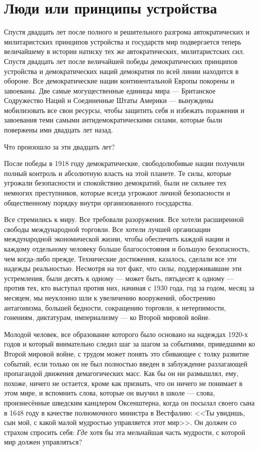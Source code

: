 \chapter{Люди или принципы устройства}

\sloppy Спустя двадцать лет после полного и решительного разгрома автократических и милитаристских принципов устройства и государств мир подвергается теперь величайшему в истории натиску тех же автократических, милитаристских сил. Спустя двадцать лет после величайшей победы демократических принципов устройства и демократических наций демократия по всей линии находится в обороне. Все демократические нации континентальной Европы покорены и завоеваны. Две самые могущественные единицы мира — Британское Содружество Наций и Соединенные Штаты Америки — вынуждены мобилизовать все свои ресурсы, чтобы защитить себя и избежать поражения и завоевания теми самыми антидемократическими силами, которые были повержены ими двадцать лет назад.

Что произошло за эти двадцать лет?

После победы в 1918 году демократические, свободолюбивые нации получили полный контроль и абсолютную власть на этой планете. Те силы, которые угрожали безопасности и спокойствию демократий, были не сильнее тех немногих преступников, которые всегда угрожают личной безопасности и общественному порядку внутри организованного государства.

Все стремились к миру. Все требовали разоружения. Все хотели расширенной свободы международной торговли. Все хотели лучшей организации международной экономической жизни, чтобы обеспечить каждой нации и каждому отдельному человеку больше благосостояния и большую безопасность, чем когда-либо прежде. Технические достижения, казалось, сделали все эти надежды реальностью. Несмотря на тот факт, что силы, поддерживавшие эти устремления, были десять к одному — может быть, пятьдесят к одному — против тех, кто выступал против них, начиная с 1930 года, год за годом, месяц за месяцем, мы неуклонно шли к увеличению вооружений, обострению антагонизма, большей бедности, сокращению торговли, к нетерпимости, гонениям, диктатурам, империализму — ко Второй мировой войне.

Молодой человек, все образование которого было основано на надеждах 1920-х годов и который внимательно следил шаг за шагом за событиями, приведшими ко Второй мировой войне, с трудом может понять это сбивающее с толку развитие событий, если только он не был полностью введен в заблуждение разлагающей пропагандой движения демагогических масс. Как бы он ни размышлял, ему, похоже, ничего не остается, кроме как признать, что он ничего не понимает в этом мире, и вспомнить слова, которые он выучил в школе — слова, произнесённые шведским канцлером Оксенштерна, когда он посылал своего сына в 1648 году в качестве полномочного министра в Вестфалию: <<Ты увидишь, сын мой, с какой малой мудростью управляется этот мир>>. Он должен со страхом спросить себя: \textit{Где} хотя бы эта мельчайшая часть мудрости, с которой мир должен управляться?

